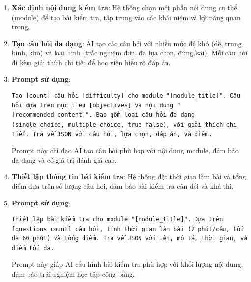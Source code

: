 \begin{enumerate}
	\item \textbf{Xác định nội dung kiểm tra}: Hệ thống chọn một phần nội dung cụ thể (module) để tạo bài kiểm tra, tập trung vào các khái niệm và kỹ năng quan trọng.

	\item \textbf{Tạo câu hỏi đa dạng}: AI tạo các câu hỏi với nhiều mức độ khó (dễ, trung bình, khó) và loại hình (trắc nghiệm đơn, đa lựa chọn, đúng/sai). Mỗi câu hỏi đi kèm giải thích chi tiết để học viên hiểu rõ đáp án.

	\item \textbf{Prompt sử dụng}:
	      \begin{Verbatim}[breaklines=true]
		      Tạo [count] câu hỏi [difficulty] cho module "[module_title]". Câu hỏi dựa trên mục tiêu [objectives] và nội dung "[recommended_content]". Bao gồm loại câu hỏi đa dạng (single_choice, multiple_choice, true_false), với giải thích chi tiết. Trả về JSON với câu hỏi, lựa chọn, đáp án, và điểm.
	      \end{Verbatim}
	      Prompt này chỉ đạo AI tạo câu hỏi phù hợp với nội dung module, đảm bảo đa dạng và có giá trị đánh giá cao.

	\item \textbf{Thiết lập thông tin bài kiểm tra}: Hệ thống đặt thời gian làm bài và tổng điểm dựa trên số lượng câu hỏi, đảm bảo bài kiểm tra cân đối và khả thi.

	\item \textbf{Prompt sử dụng}:
	      \begin{Verbatim}[breaklines=true]
		      Thiết lập bài kiểm tra cho module "[module_title]". Dựa trên [questions_count] câu hỏi, tính thời gian làm bài (2 phút/câu, tối đa 60 phút) và tổng điểm. Trả về JSON với tên, mô tả, thời gian, và điểm tối đa.
	      \end{Verbatim}
	      Prompt này giúp AI cấu hình bài kiểm tra phù hợp với khối lượng nội dung, đảm bảo trải nghiệm học tập công bằng.
\end{enumerate}

